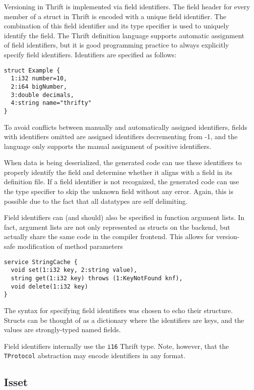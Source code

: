 \documentclass[nocopyrightspace,blockstyle]{sigplanconf}
\begin{document}
Versioning in Thrift is implemented via field identifiers. The field header
for every member of a struct in Thrift is encoded with a unique field
identifier. The combination of this field identifier and its type specifier
is used to uniquely identify the field. The Thrift definition language
supports automatic assignment of field identifiers, but it is good
programming practice to always explicitly specify field identifiers.
Identifiers are specified as follows:

\begin{verbatim}
struct Example {
  1:i32 number=10,
  2:i64 bigNumber,
  3:double decimals,
  4:string name="thrifty"
}\end{verbatim}

To avoid conflicts between manually and automatically assigned identifiers,
fields with identifiers omitted are assigned identifiers
decrementing from -1, and the language only supports the manual assignment of
positive identifiers.

When data is being deserialized, the generated code can use these identifiers
to properly identify the field and determine whether it aligns with a field in
its definition file. If a field identifier is not recognized, the generated
code can use the type specifier to skip the unknown field without any error.
Again, this is possible due to the fact that all datatypes are self
delimiting.

Field identifiers can (and should) also be specified in function argument
lists. In fact, argument lists are not only represented as structs on the
backend, but actually share the same code in the compiler frontend. This
allows for version-safe modification of method parameters

\begin{verbatim}
service StringCache {
  void set(1:i32 key, 2:string value),
  string get(1:i32 key) throws (1:KeyNotFound knf),
  void delete(1:i32 key) 
}
\end{verbatim}

The syntax for specifying field identifiers was chosen to echo their structure.
Structs can be thought of as a dictionary where the identifiers are keys, and
the values are strongly-typed named fields.

Field identifiers internally use the \texttt{i16} Thrift type. Note, however,
that the \texttt{TProtocol} abstraction may encode identifiers in any format.

\subsection{Isset}
\end{document}
